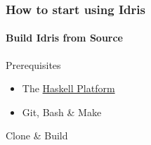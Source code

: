 \begin{frame}[fragile]
\frametitle{How to start using Idris}
\framesubtitle{Build Idris from Source}

\begin{block}{Prerequisites}
\begin{itemize}
\item The \hyperlink{https://www.haskell.org/platform/}{Haskell Platform}
\item Git, Bash \& Make
\end{itemize}
\end{block}

\begin{block}{Clone \& Build}

\end{block}

\end{frame}
